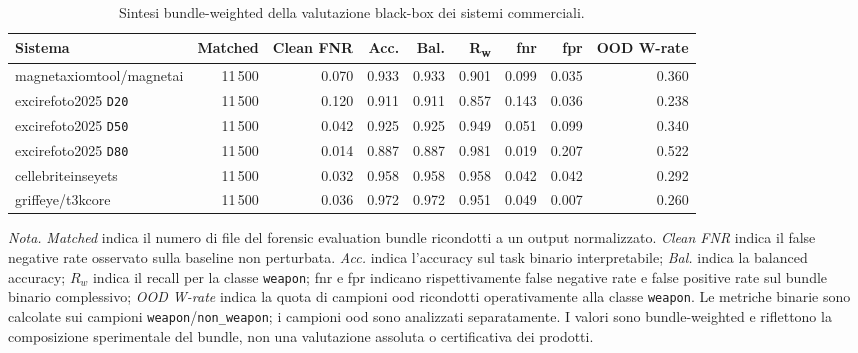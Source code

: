 \begin{table}[H]
\centering
\scriptsize
\renewcommand{\arraystretch}{1.15}
\setlength{\tabcolsep}{2.6pt}
\caption{Sintesi bundle-weighted della valutazione black-box dei sistemi commerciali.}
\label{tab:results-commercial-overview}
\begin{tabular}{@{}l r r r r r r r r@{}}
\toprule
\textbf{Sistema} &
\textbf{Matched} &
\textbf{Clean FNR} &
\textbf{Acc.} &
\textbf{Bal.} &
\textbf{R\textsubscript{w}} &
\textbf{\acrshort{fnr}} &
\textbf{\acrshort{fpr}} &
\textbf{OOD W-rate} \\
\midrule
\gls{magnetaxiomtool}/\gls{magnetai}
& 11\,500 & 0.070 & 0.933 & 0.933 & 0.901 & 0.099 & 0.035 & 0.360 \\

\gls{excirefoto2025} \texttt{D20}
& 11\,500 & 0.120 & 0.911 & 0.911 & 0.857 & 0.143 & 0.036 & 0.238 \\

\gls{excirefoto2025} \texttt{D50}
& 11\,500 & 0.042 & 0.925 & 0.925 & 0.949 & 0.051 & 0.099 & 0.340 \\

\gls{excirefoto2025} \texttt{D80}
& 11\,500 & 0.014 & 0.887 & 0.887 & 0.981 & 0.019 & 0.207 & 0.522 \\

\gls{cellebriteinseyets}
& 11\,500 & 0.032 & 0.958 & 0.958 & 0.958 & 0.042 & 0.042 & 0.292 \\

\gls{griffeye}/\gls{t3kcore}
& 11\,500 & 0.036 & 0.972 & 0.972 & 0.951 & 0.049 & 0.007 & 0.260 \\

\bottomrule
\end{tabular}

\vspace{0.4em}
\footnotesize
\textit{Nota.} \textit{Matched} indica il numero di file del forensic evaluation
bundle ricondotti a un output normalizzato. \textit{Clean FNR} indica il false
negative rate osservato sulla baseline non perturbata. \textit{Acc.} indica
l'accuracy sul task binario interpretabile; \textit{Bal.} indica la balanced
accuracy; \(R_w\) indica il recall per la classe \texttt{weapon}; \gls{fnr} e
\gls{fpr} indicano rispettivamente false negative rate e false positive rate sul
bundle binario complessivo; \textit{OOD W-rate} indica la quota di campioni
\gls{ood} ricondotti operativamente alla classe \texttt{weapon}. Le metriche
binarie sono calcolate sui campioni \texttt{weapon}/\texttt{non\_weapon}; i
campioni \gls{ood} sono analizzati separatamente. I valori sono bundle-weighted e
riflettono la composizione sperimentale del bundle, non una valutazione assoluta
o certificativa dei prodotti.
\end{table}

